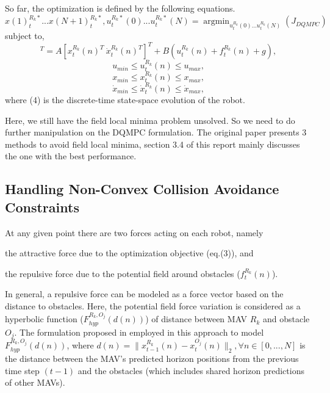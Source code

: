 \documentclass[12pt]{article}
\begin{document}
So far, the optimization is defined by the following equations.
\begin{equation}
x(1)_{t}^{R_{k}*}...x(N+1)_{t}^{R_{k}*},u_{t}^{R_{k}*}(0)...u_{t}^{R_{k}*}(N) = \mathop{\arg\min}_{u_{t}^{R_{k}}(0)...u_{t}^{R_{k}}(N)}(J_{DQMPC})
\label{eq:opm}
\end{equation}
subject to,
\begin{equation}
[{x}_{t}^{R_{k}}(n+1)^{T}\ \dot{x}_{t}^{R_{k}}(n+1)^{T}]^{T}=A[{x}_{t}^{R_{k}}(n)^{T}\ \dot{x}_{t}^{R_{k}}(n)^{T}]^{T}+B(u_{t}^{R_{k}}(n)+f_{t}^{R_{k}}(n)+g),
\label{eq:steady-state}
\end{equation}
\begin{equation}
u_{min}\leq u_{t}^{R_{k}}(n)\leq u_{max},
\end{equation}
\begin{equation}
x_{min}\leq x_{t}^{R_{k}}(n)\leq x_{max},
\end{equation}
\begin{equation}
\dot{x}_{min}\leq \dot{x}_{t}^{R_{k}}(n)\leq \dot{x}_{max},
\end{equation}
where (4) is the discrete-time state-space evolution of the robot.

Here, we still have the field local minima problem unsolved. So we need to do further manipulation on the DQMPC formulation. The original paper presents 3 methods to avoid field local minima, section 3.4 of this report mainly discusses the one with the best performance.

\subsection{Handling Non-Convex Collision Avoidance Constraints}
\label{sec:nonconvex}
At any given point there are two forces acting on each robot, namely 
\begin{inparaenum}[(i)]
\item the attractive force due to the optimization objective (eq.(3)), and
\item the repulsive force due to the potential field around obstacles ($f_{t}^{R_{k}}(n)$). 
\end{inparaenum}
In general, a repulsive force can be modeled as a force vector based on the distance to obstacles. Here, the potential field force variation is considered as a hyperbolic function ($F_{hyp}^{R_{k},O_{j}}(d(n))$) of distance between MAV $R_{k}$ and obstacle $O_{j}$.
The formulation proposed in \cite{secchi2013bilateral} employed in this approach to model $F_{hyp}^{R_{k},O_{j}}(d(n))$, where $d(n)=\lVert x_{t-1}^{R_{k}}(n)-x_{t}^{O_{j}}(n) \rVert_{2}, \forall n \in [0,...,N]$ is the distance between the MAV's predicted horizon positions from the previous time step $(t-1)$ and the obstacles (which includes shared horizon predictions of other MAVs).
\end{document}
